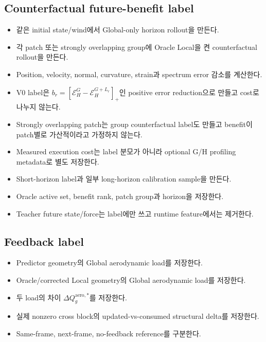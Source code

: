 \documentclass[10pt,a4paper]{article}
\newcommand{\todo}{\textcolor{TodoGray}{\(\square\)}}
\begin{document}
\subsection*{Counterfactual future-benefit label}

\begin{itemize}
  \item[\todo] 같은 initial state/wind에서 Global-only horizon rollout을 만든다.
  \item[\todo] 각 patch 또는 strongly overlapping group에 Oracle Local을 켠 counterfactual rollout을 만든다.
  \item[\todo] Position, velocity, normal, curvature, strain과 spectrum error 감소를 계산한다.
  \item[\todo] V0 label은 \(b_r=[\mathcal E_H^G-\mathcal E_H^{G+L_r}]_+\)인 positive error reduction으로 만들고 cost로 나누지 않는다.
  \item[\todo] Strongly overlapping patch는 group counterfactual label도 만들고 benefit이 patch별로 가산적이라고 가정하지 않는다.
  \item[\todo] Measured execution cost는 label 분모가 아니라 optional G/H profiling metadata로 별도 저장한다.
  \item[\todo] Short-horizon label과 일부 long-horizon calibration sample을 만든다.
  \item[\todo] Oracle active set, benefit rank, patch group과 horizon을 저장한다.
  \item[\todo] Teacher future state/force는 label에만 쓰고 runtime feature에서는 제거한다.
\end{itemize}

\subsection*{Feedback label}

\begin{itemize}
  \item[\todo] Predictor geometry의 Global aerodynamic load를 저장한다.
  \item[\todo] Oracle/corrected Local geometry의 Global aerodynamic load를 저장한다.
  \item[\todo] 두 load의 차이 \(\Delta Q_g^{\mathrm{aero},*}\)를 저장한다.
  \item[\todo] 실제 nonzero cross block의 updated-vs-consumed structural delta를 저장한다.
  \item[\todo] Same-frame, next-frame, no-feedback reference를 구분한다.
\end{itemize}
\end{document}
